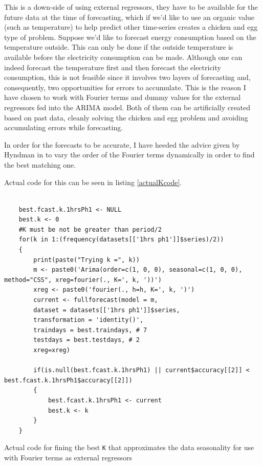 \documentclass[12pt,a4paper,titlepage]{report}
\begin{document}
This is a down-side of using external regressors, they have to be available for the future data at the time of forecasting, which if we'd like to use an organic value (such as temperature) to help predict other time-series creates a chicken and egg type of problem. Suppose we'd like to forecast energy consumption based on the temperature outside. This can only be done if the outside temperature is available before the electricity consumption can be made. Although one can indeed forecast the temperature first and then forecast the electricity consumption, this is not feasible since it involves two layers of forecasting and, consequently, two opportunities for errors to accumulate. This is the reason I have chosen to work with Fourier terms and dummy values for the external regressors fed into the ARIMA model. Both of them can be artificially created based on past data, cleanly solving the chicken and egg problem and avoiding accumulating errors while forecasting.

In order for the forecasts to be accurate, I have heeded the advice given by Hyndman in \cite{fpp2dhr} to vary the order of the Fourier terms dynamically in order to find the best matching one.

Actual code for this can be seen in listing \ref{actualKcode}.

\begin{listing}[h]
\begin{verbatim}

    best.fcast.k.1hrsPh1 <- NULL
    best.k <- 0
    #K must be not be greater than period/2
    for(k in 1:(frequency(datasets[['1hrs ph1']]$series)/2))
    {
        print(paste("Trying k =", k))
        m <- paste0('Arima(order=c(1, 0, 0), seasonal=c(1, 0, 0), method="CSS", xreg=fourier(., K=', k, '))')
        xreg <- paste0('fourier(., h=h, K=', k, ')')
        current <- fullforecast(model = m,
        dataset = datasets[['1hrs ph1']]$series,
        transformation = 'identity()',
        traindays = best.traindays, # 7
        testdays = best.testdays, # 2
        xreg=xreg)
        
        if(is.null(best.fcast.k.1hrsPh1) || current$accuracy[[2]] < best.fcast.k.1hrsPh1$accuracy[[2]])
        {
            best.fcast.k.1hrsPh1 <- current
            best.k <- k
        }
    }

\end{verbatim}

\caption{Actual code for fining the best \texttt{K} that approximates the data seasonality for use with Fourier terms as external regressors}
\label{actualKcode}
\end{listing}
\end{document}
